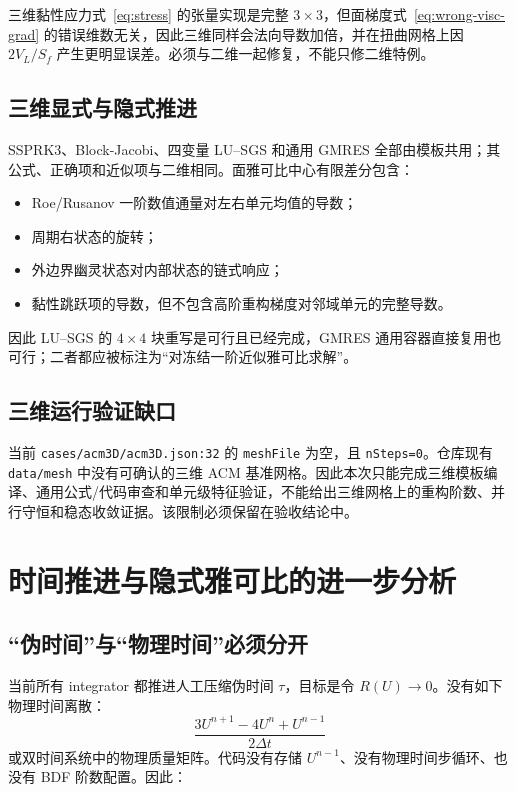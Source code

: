 \documentclass[UTF8,11pt,a4paper]{ctexart}
\newcommand{\code}[1]{\nolinkurl{#1}}
\begin{document}
三维黏性应力式~\eqref{eq:stress} 的张量实现是完整 $3\times3$，但面梯度式~\eqref{eq:wrong-visc-grad} 的错误维数无关，因此三维同样会法向导数加倍，并在扭曲网格上因 $2V_L/S_f$ 产生更明显误差。必须与二维一起修复，不能只修二维特例。

\subsection{三维显式与隐式推进}

SSPRK3、Block-Jacobi、四变量 LU--SGS 和通用 GMRES 全部由模板共用；其公式、正确项和近似项与二维相同。面雅可比中心有限差分包含：

\begin{itemize}
  \item Roe/Rusanov 一阶数值通量对左右单元均值的导数；
  \item 周期右状态的旋转；
  \item 外边界幽灵状态对内部状态的链式响应；
  \item 黏性跳跃项的导数，但不包含高阶重构梯度对邻域单元的完整导数。
\end{itemize}

因此 LU--SGS 的 $4\times4$ 块重写是可行且已经完成，GMRES 通用容器直接复用也可行；二者都应被标注为“对冻结一阶近似雅可比求解”。

\subsection{三维运行验证缺口}

当前 \code{cases/acm3D/acm3D.json:32} 的 \code{meshFile} 为空，且 \code{nSteps=0}。仓库现有 \code{data/mesh} 中没有可确认的三维 ACM 基准网格。因此本次只能完成三维模板编译、通用公式/代码审查和单元级特征验证，不能给出三维网格上的重构阶数、并行守恒和稳态收敛证据。该限制必须保留在验收结论中。

\section{时间推进与隐式雅可比的进一步分析}

\subsection{“伪时间”与“物理时间”必须分开}

当前所有 integrator 都推进人工压缩伪时间 $\tau$，目标是令 $R(U)\to0$。没有如下物理时间离散：
\begin{equation}
 \frac{3U^{n+1}-4U^n+U^{n-1}}{2\Delta t}
\end{equation}
或双时间系统中的物理质量矩阵。代码没有存储 $U^{n-1}$、没有物理时间步循环、也没有 BDF 阶数配置。因此：
\end{document}
